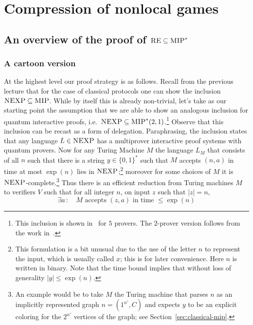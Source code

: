 \chapter{Compression of nonlocal games}


\section{An overview of the proof of $\textsc{RE}\subseteq \textsc{MIP}^*$}


\subsection{A cartoon version}
\label{sec:cartoon}

At the highest level our proof strategy is as follows. Recall from the previous lecture that for the case of classical protocols one can show the inclusion $\textsc{NEXP} \subseteq \textsc{MIP}$. While by itself this is already non-trivial, let's take as our starting point the assumption that we are able to show an analogous inclusion for quantum interactive proofs, i.e.\ $\textsc{NEXP} \subseteq \textsc{MIP}^*(2,1)$.\footnote{This inclusion is shown in~\cite{ito2012multi} for $5$ provers. The $2$-prover version follows from the work in~\cite{ji2020quantum}.} Observe that this inclusion can be recast as a form of delegation. Paraphrasing, the inclusion states that any language $L\in \textsc{NEXP}$ has a multiprover interactive proof systems with quantum provers. Now for any Turing Machine $M$ the language $L_M $ that consists of all  $n$  such that there is a string $y\in\{0,1\}^*$ such that $M$ accepts $(n,a)$ in time at most $\exp(n)$ lies in $\textsc{NEXP}$;\footnote{This formulation is a bit unusual due to the use of the letter $n$ to represent the input, which is usually called $x$; this is for later convenience.  Here $n$ is written in binary. Note that the time bound implies that without loss of generality $|y|\leq \exp(n)$.} moreover for some choices of $M$ it is $\textsc{NEXP}$-complete.\footnote{An example would be to take $M$ the Turing machine that parses $n$ as an implicitly represented graph $n=(1^{n'},C)$ and expects $y$ to be an explicit coloring for the $2^{n'}$ vertices of the graph; see Section~\ref{sec:classical-mip}.} Thus there is an efficient reduction from Turing machines $M$ to verifiers $V$ such that for all integer $n$, on input $z$ such that $|z|=n$, 
\begin{equation}\label{eq:cond-nexp-1}
 \exists a\,:\quad\text{$M$ accepts $(z,a)$ in time $\leq \exp(n)$}
\end{equation}
